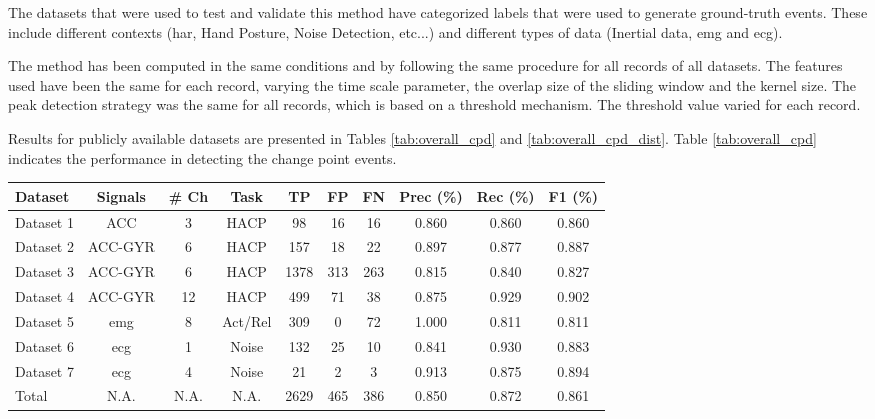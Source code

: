 The datasets that were used to test and validate this method have categorized labels that were used to generate ground-truth events. These include different contexts (\gls{har}, Hand Posture, Noise Detection, etc...) and different types of data (Inertial data, \gls{emg} and \gls{ecg}).
\par
The method has been computed in the same conditions and by following the same procedure for all records of all datasets. The features used have been the same for each record, varying the time scale parameter, the overlap size of the sliding window and the kernel size. The peak detection strategy was the same for all records, which is based on a threshold mechanism. The threshold value varied for each record.  
\par
Results for publicly available datasets are presented in Tables \ref{tab:overall_cpd} and \ref{tab:overall_cpd_dist}. Table \ref{tab:overall_cpd} indicates the performance in detecting the change point events. 

\begin{table*}
	\begin{center}
		\begin{tabular}{lccccccccc}
			\toprule
			Dataset & Signals & \# Ch & Task & TP & FP & FN & Prec (\%) & Rec (\%) & F1 (\%) \\
			\toprule
			Dataset 1 & ACC & 3 & HACP & 98 & 16 & 16 & 0.860 & 0.860 & 0.860 \\
			Dataset 2 & ACC-GYR & 6 & HACP & 157 & 18 & 22 & 0.897 & 0.877 & 0.887 \\
			Dataset 3 & ACC-GYR & 6 & HACP & 1378 & 313 & 263 & 0.815 & 0.840 & 0.827 \\
			Dataset 4 & ACC-GYR & 12 & HACP & 499 & 71 & 38 & 0.875 & 0.929 & 0.902 \\
			Dataset 5 & \gls{emg} & 8 & Act/Rel & 309 & 0 & 72 & 1.000 & 0.811 & 0.811 \\
			Dataset 6  & \gls{ecg} & 1 & Noise & 132 & 25 & 10 & 0.841 & 0.930 & 0.883 \\
			Dataset 7  & \gls{ecg} & 4 & Noise & 21 & 2 & 3 & 0.913 & 0.875 & 0.894 \\
			\midrule
			Total  & N.A. & N.A. & N.A. & 2629 & 465 & 386 & 0.850 & 0.872 & 0.861 \\
			\bottomrule
		\end{tabular}
	\end{center}
	\caption{Overall results for the performance of the method on novelty segmentation. The dimension of the records is presented on the column \textit{\# Ch}, as well as the types of signals used and the task in which  applied (HACP - Human Activity Change Point detection; Act/Rel - Activation/Relaxation of the \gls{emg} detection and Noise detection).}
	\label{tab:overall_cpd}
\end{table*}


